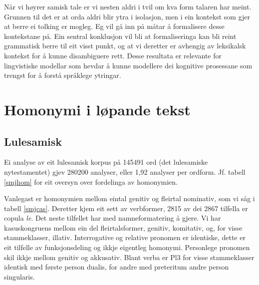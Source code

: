 \documentclass[a4paper,nynorsk]{article}
\begin{document}
Når vi høyrer samisk tale er vi nesten aldri i tvil om kva form talaren har meint. Grunnen til det er at orda aldri blir ytra i isolasjon, men i ein kontekst som gjer at berre ei tolking er mogleg. Eg vil gå inn på måtar å formalisere desse kontekstane på. Ein sentral konklusjon vil bli at formaliseringa kan bli reint grammatisk berre til eit visst punkt, og at vi deretter er avhengig av leksikalsk kontekst for å kunne disambiguere rett. Desse resultata er relevante for lingvistiske modellar som hevdar å kunne modellere dei kognitive prosessane som trengst for å forstå språklege ytringar.%


\section{Homonymi i løpande tekst}


\subsection{Lulesamisk} 
 
Ei analyse av eit lulesamisk korpus på 145491 ord (det lulesamiske nytestamentet) gjev 280200  analyser, eller 1,92 analyser per ordform. Jf. tabell \ref{smjhom} for eit oversyn over fordelinga av homonymien.%

Vanlegast er homonymien mellom eintal genitiv og fleirtal nominativ, som vi såg i tabell \ref{smjcas}. Deretter kjem eit sett av verbformer, 2815 av dei 2867 tilfella er copula \emph{le}. Det neste tilfellet har med namneformatering å gjere. Vi har kasuskongruens mellom ein del fleirtalsformer, genitiv, komitativ, og, for visse stammeklasser, illativ. Interrogative og relative pronomen er identiske, dette er eit tilfelle av funksjonsdeling og ikkje eigentleg homonymi. Personlege pronomen skil ikkje mellom genitiv og akkusativ. Blant verba er Pl3 for visse stammeklasser identisk med første person dualis, for andre med preteritum andre person singularis.%
\end{document}
